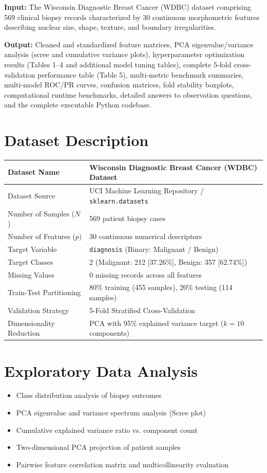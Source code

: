 \documentclass[12pt,a4paper]{article}
\begin{document}
\textbf{Input:} The Wisconsin Diagnostic Breast Cancer (WDBC) dataset comprising 569 clinical biopsy records characterized by 30 continuous morphometric features describing nuclear size, shape, texture, and boundary irregularities.

\textbf{Output:} Cleaned and standardized feature matrices, PCA eigenvalue/variance analysis (scree and cumulative variance plots), hyperparameter optimization results (Tables 1--4 and additional model tuning tables), complete 5-fold cross-validation performance table (Table 5), multi-metric benchmark summaries, multi-model ROC/PR curves, confusion matrices, fold stability boxplots, computational runtime benchmarks, detailed answers to observation questions, and the complete executable Python codebase.

\section{Dataset Description}
\begin{longtable}{|p{6cm}|p{8cm}|}
\hline
Dataset Name & Wisconsin Diagnostic Breast Cancer (WDBC) Dataset\\ \hline
Dataset Source & UCI Machine Learning Repository / \texttt{sklearn.datasets}\\ \hline
Number of Samples ($N$) & 569 patient biopsy cases\\ \hline
Number of Features ($p$) & 30 continuous numerical descriptors\\ \hline
Target Variable & \texttt{diagnosis} (Binary: Malignant / Benign)\\ \hline
Target Classes & 2 (Malignant: 212 [37.26\%], Benign: 357 [62.74\%])\\ \hline
Missing Values & 0 missing records across all features\\ \hline
Train-Test Partitioning & 80\% training (455 samples), 20\% testing (114 samples)\\ \hline
Validation Strategy & 5-Fold Stratified Cross-Validation\\ \hline
Dimensionality Reduction & PCA with 95\% explained variance target ($k=10$ components)\\ \hline
\end{longtable}

\section{Exploratory Data Analysis}
\begin{itemize}
    \item Class distribution analysis of biopsy outcomes
    \item PCA eigenvalue and variance spectrum analysis (Scree plot)
    \item Cumulative explained variance ratio vs. component count
    \item Two-dimensional PCA projection of patient samples
    \item Pairwise feature correlation matrix and multicollinearity evaluation
\end{itemize}
\end{document}
